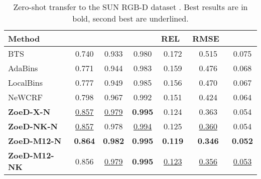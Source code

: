\documentclass[10pt,twocolumn,letterpaper]{article}
\begin{document}
\begin{table}[htb]
\centering
\setlength{\tabcolsep}{3pt} \small
\begin{tabular}{@{}lcccccc@{}}
\toprule
Method &  &  &  & REL~ & RMSE~ & \\ \midrule
BTS~\cite{bts_lee2019big}               & 0.740     & 0.933     & 0.980     & 0.172     & 0.515     & 0.075     \\ 
AdaBins~\cite{bhat2021adabins}          & 0.771     & 0.944     & 0.983     & 0.159     & 0.476     & 0.068     \\ 
LocalBins~\cite{bhat2022localbins}      & {0.777}   & {0.949}   & {0.985}   & {0.156}   & {0.470}   &  {0.067}  \\
NeWCRF~\cite{yuan2022new}               & {0.798}   & {0.967}   & {0.992}   & {0.151}   & {0.424}   &  {0.064}  \\ 

\midrule
\textbf{ZoeD-X-N}       & \underline{0.857} & \underline{0.979} & \textbf{0.995} & {0.124} &  0.363 & {0.054} \\ 
\textbf{ZoeD-NK-N}      & \underline{0.857} & 0.978 & \underline{0.994} & 0.125 &  \underline{0.360}  & {0.054} \\
\textbf{ZoeD-M12-N}     & \textbf{0.864} &            \textbf{0.982} &            \textbf{0.995} &                \textbf{ 0.119} &              \textbf{0.346} &                \textbf{0.052} \\
\textbf{ZoeD-M12-NK}    & 0.856 &            \underline{0.979} &           \textbf{ 0.995} &                 \underline{0.123} &              \underline{0.356} &                \underline{0.053} \\
\bottomrule
\end{tabular}
\caption{Zero-shot transfer to the SUN RGB-D dataset \cite{Song2015_sunrgbd}. Best results are in bold, second best are underlined.}
\label{tab:sunrgbd-full}
\end{table}
\end{document}
